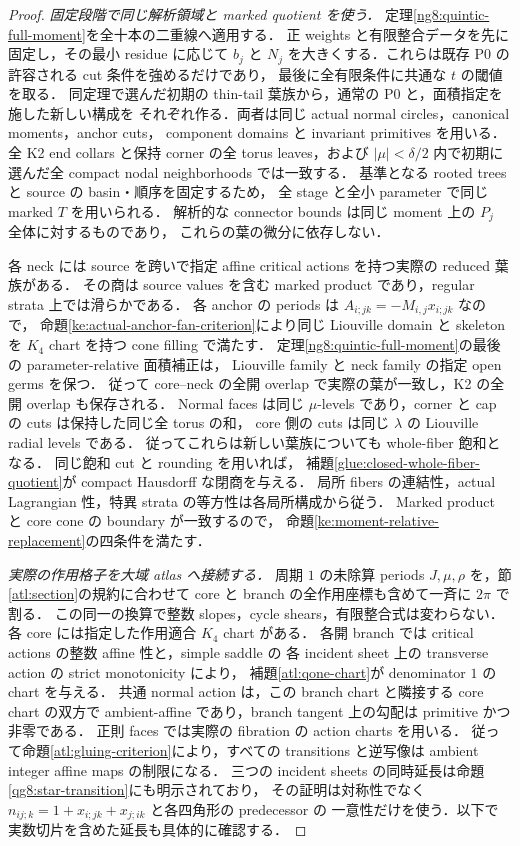 \begin{proof}
\emph{固定段階で同じ解析領域と marked quotient を使う．}
定理\ref{ng8:quintic-full-moment}を全十本の二重線へ適用する．
正 weights と有限整合データを先に固定し，その最小 residue に応じて
$b_j$ と $N_j$ を大きくする．これらは既存 P0 の許容される cut 条件を強めるだけであり，
最後に全有限条件に共通な $t$ の閾値を取る．
同定理で選んだ初期の thin-tail 葉族から，通常の P0 と，面積指定を施した新しい構成を
それぞれ作る．両者は同じ actual normal circles，canonical moments，anchor cuts，
component domains と invariant primitives を用いる．
全 K2 end collars と保持 corner の全 torus leaves，および
$|\mu|<\delta/2$ 内で初期に選んだ全 compact nodal neighborhoods では一致する．
基準となる rooted trees と source の basin・順序を固定するため，
全 stage と全小 parameter で同じ marked $T$ を用いられる．
解析的な connector bounds は同じ moment 上の $P_j$ 全体に対するものであり，
これらの葉の微分に依存しない．

各 neck には source を跨いで指定 affine critical actions を持つ実際の reduced 葉族がある．
その商は source values を含む marked product であり，regular strata 上では滑らかである．
各 anchor の periods は $A_{i;jk}=-M_{i,j}x_{i;jk}$ なので，
命題\ref{ke:actual-anchor-fan-criterion}により同じ Liouville domain と skeleton を
$K_4$ chart を持つ cone filling で満たす．
定理\ref{ng8:quintic-full-moment}の最後の parameter-relative 面積補正は，
Liouville family と neck family の指定 open germs を保つ．
従って core--neck の全開 overlap で実際の葉が一致し，K2 の全開 overlap も保存される．
Normal faces は同じ $\mu$-levels であり，corner と cap の cuts は保持した同じ全 torus の和，
core 側の cuts は同じ $\lambda$ の Liouville radial levels である．
従ってこれらは新しい葉族についても whole-fiber 飽和となる．
同じ飽和 cut と rounding を用いれば，
補題\ref{glue:closed-whole-fiber-quotient}が compact Hausdorff な閉商を与える．
局所 fibers の連結性，actual Lagrangian 性，特異 strata の等方性は各局所構成から従う．
Marked product と core cone の boundary が一致するので，
命題\ref{ke:moment-relative-replacement}の四条件を満たす．

\emph{実際の作用格子を大域 atlas へ接続する．}
周期 $1$ の未除算 periods $J,\mu,\rho$ を，節\ref{atl:section}の規約に合わせて
core と branch の全作用座標も含めて一斉に $2\pi$ で割る．
この同一の換算で整数 slopes，cycle shears，有限整合式は変わらない．
各 core には指定した作用適合 $K_4$ chart がある．
各開 branch では critical actions の整数 affine 性と，simple saddle の
各 incident sheet 上の transverse action の strict monotonicity により，
補題\ref{atl:qone-chart}が denominator $1$ の chart を与える．
共通 normal action は，この branch chart と隣接する core chart の双方で
ambient-affine であり，branch tangent 上の勾配は primitive かつ非零である．
正則 faces では実際の fibration の action charts を用いる．
従って命題\ref{atl:gluing-criterion}により，すべての transitions と逆写像は
ambient integer affine maps の制限になる．
三つの incident sheets の同時延長は命題\ref{qg8:star-transition}にも明示されており，
その証明は対称性でなく $n_{ij;k}=1+x_{i;jk}+x_{j;ik}$ と各四角形の predecessor の
一意性だけを使う．以下で実数切片を含めた延長も具体的に確認する．


\end{proof}
